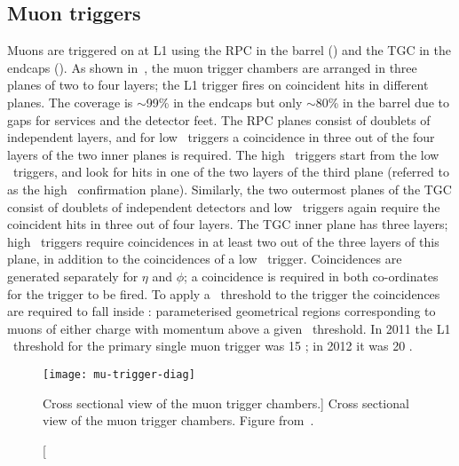 \subsection{Muon triggers}
\label{sec:reco-mu-triggers}

Muons are triggered on at L1 using the RPC in the barrel () and
the TGC in the endcaps (). As shown in~, the
muon trigger chambers are arranged in three planes of two to four layers; the L1
trigger fires on coincident hits in different planes. The coverage is $\sim$99\% in the
endcaps but only $\sim$80\% in the barrel due to gaps for services and the
detector feet.  The RPC planes consist of doublets of independent layers, and
for low \pt\ triggers a coincidence in three out of the four layers of the two inner planes
is required. The high \pt\ triggers start from the low \pt\ triggers, and look
for hits in one of the two layers of the third plane (referred to as the high
\pt\ confirmation plane). Similarly, the two outermost planes of the TGC consist
of doublets of independent detectors and low \pt\ triggers again require the
coincident hits in three out of four layers. The TGC inner plane has three
layers; high \pt\ triggers require coincidences in at least two out of the three layers
of this plane, in addition to the coincidences of a low \pt\ trigger. Coincidences are generated
separately for $\eta$ and $\phi$; a coincidence is required in both co-ordinates
for the trigger to be fired. To apply a \pt\ threshold to the trigger the
coincidences are required to fall inside : parameterised
geometrical regions corresponding to muons of either charge with momentum above
a given \pt\ threshold. In 2011 the L1 \pt\ threshold for the primary single
muon trigger was 15 \GeV; in 2012 it was 20 \GeV.

\begin{figure}[h]
\centering
            \texttt{[image: mu-trigger-diag]}
    \caption[Cross sectional view of the muon trigger chambers. ][Cross
    sectional view of the muon trigger chambers.] {Cross sectional view of the
    muon trigger chambers. Figure from~\cite{Aad:2012xs}.}
    \label{fig:mu-trigger-diag}
\end{figure}

